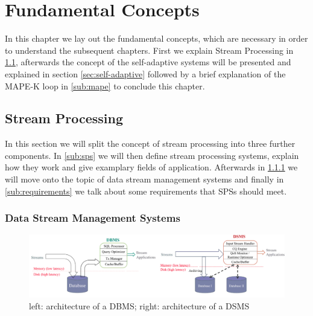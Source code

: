 
\chapter{Fundamental Concepts}
\label{cha:fundamentals}
In this chapter we lay out the fundamental concepts, which are necessary in order to understand the subsequent chapters.
First we explain Stream Processing in \ref{sec:stream-processing}, afterwards the concept of the self-adaptive systems will be presented and explained in section \ref{sec:self-adaptive} 
followed by a brief explanation of the MAPE-K loop in \ref{sub:mape} to conclude this chapter.

    \section{Stream Processing}
    \label{sec:stream-processing}
    In this section we will split the concept of stream processing into three further components.
    In \ref{sub:sps} we will then define stream processing systems, explain how they work and give examplary fields of application.
    Afterwards in \ref{sub:dsms} we will move onto the topic of data stream management systems and finally in \ref{sub:requirements} we talk about
    some requirements that SPSs should meet.
    
        \subsection{Data Stream Management Systems}
        \label{sub:dsms}

        \begin{figure}[h]
            \label{fig:dbms_dsms}
            \centering
            \includegraphics[width=1.0\textwidth]{Bilder/dbms_dsms.png}
            \caption{
                   left: architecture of a DBMS; right: architecture of a DSMS
                   }
        \end{figure}

